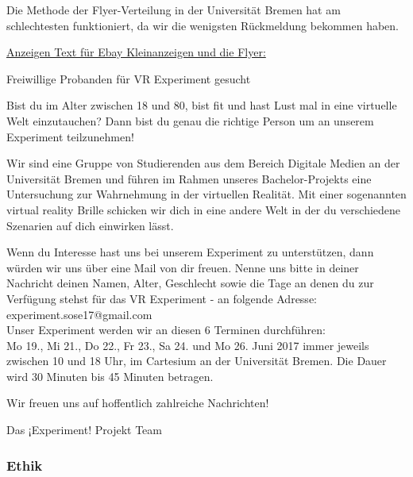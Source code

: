 \documentclass{Bericht}
\begin{document}
Die Methode der Flyer-Verteilung in der Universität Bremen hat am schlechtesten funktioniert, da wir die wenigsten Rückmeldung bekommen haben.
\par

\underline{Anzeigen Text für Ebay Kleinanzeigen und die Flyer:}

Freiwillige Probanden für VR Experiment gesucht

Bist du im Alter zwischen 18 und 80, bist fit und hast Lust mal in eine virtuelle Welt einzutauchen? Dann bist du genau die richtige Person um an unserem Experiment teilzunehmen!

Wir sind eine Gruppe von Studierenden aus dem Bereich Digitale Medien an der Universität Bremen und führen im Rahmen unseres Bachelor-Projekts eine Untersuchung zur Wahrnehmung in der virtuellen Realität. Mit einer sogenannten \glqq virtual reality Brille\grqq{} schicken wir dich in eine andere Welt in der du verschiedene Szenarien auf dich einwirken lässt.

Wenn du Interesse hast uns bei unserem Experiment zu unterstützen, dann würden wir uns über eine Mail von dir freuen. Nenne uns bitte in deiner Nachricht deinen Namen, Alter, Geschlecht sowie die Tage an denen du zur Verfügung stehst für das VR Experiment - an folgende Adresse: experiment.sose17@gmail.com \\

Unser Experiment werden wir an diesen 6 Terminen durchführen: \\

Mo 19., Mi 21., Do 22., Fr 23., Sa 24. und Mo 26. Juni 2017 immer jeweils zwischen 10 und 18 Uhr, im Cartesium an der Universität Bremen. Die Dauer wird 30 Minuten bis 45 Minuten betragen.

Wir freuen uns auf hoffentlich zahlreiche Nachrichten!

Das ¡Experiment! Projekt Team

\subsubsection {Ethik}
\end{document}
